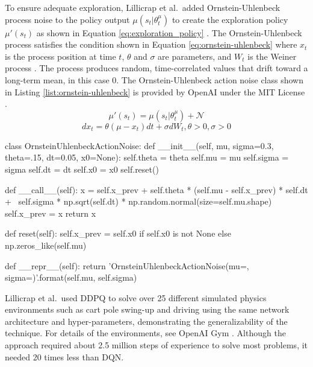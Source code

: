 To ensure adequate exploration, Lillicrap et al.\ added Ornstein-Uhlenbeck process noise to the policy output $\mu(s_t | \theta^\mu_t)$ to create the exploration policy $\mu'(s_t)$ as shown in Equation \ref{eq:exploration_policy} \cite{lillicrap_2016}. The Ornstein-Uhlenbeck process satisfies the condition shown in Equation \ref{eq:ornstein-uhlenbeck} where $x_t$ is the process position at time $t$, $\theta$ and $\sigma$ are parameters, and $W_t$ is the Weiner process \cite{uhlenbeck_ornstein}. The process produces random, time-correlated values that drift toward a long-term mean, in this case 0. The Ornstein-Uhlenbeck action noise class shown in Listing \ref{list:ornstein-uhlenbeck} is provided by OpenAI under the MIT License \cite{ddpg_noise}.
\begin{equation}
\label{eq:exploration_policy}
\mu'(s_t) = \mu(s_t | \theta^\mu_t) + \mathcal{N}
\end{equation}
\begin{equation}
\label{eq:ornstein-uhlenbeck}
dx_t = \theta(\mu-x_t) dt + \sigma dW_t, \theta>0, \sigma>0
\end{equation}
\begin{python}[caption={Ornstein-Uhlenbeck Action Noise \cite{ddpg_noise}},label={list:ornstein-uhlenbeck}]
class OrnsteinUhlenbeckActionNoise:
    def __init__(self, mu, sigma=0.3, theta=.15, dt=0.05, x0=None):
        self.theta = theta
        self.mu = mu
        self.sigma = sigma
        self.dt = dt
        self.x0 = x0
        self.reset()

    def __call__(self):
        x = self.x_prev + self.theta * (self.mu - self.x_prev) * self.dt + \
                self.sigma * np.sqrt(self.dt) * np.random.normal(size=self.mu.shape)
        self.x_prev = x
        return x

    def reset(self):
        self.x_prev = self.x0 if self.x0 is not None else np.zeros_like(self.mu)

    def __repr__(self):
        return 'OrnsteinUhlenbeckActionNoise(mu={}, sigma={})'.format(self.mu, self.sigma)
\end{python}

Lillicrap et al.\ used DDPQ to solve over 25 different simulated physics environments such as cart pole swing-up and driving using the same network architecture and hyper-parameters, demonstrating the generalizability of the technique. For details of the environments, see OpenAI Gym \cite{openaigym}. Although the approach required about 2.5 million steps of experience to solve most problems, it needed 20 times less than DQN. 

